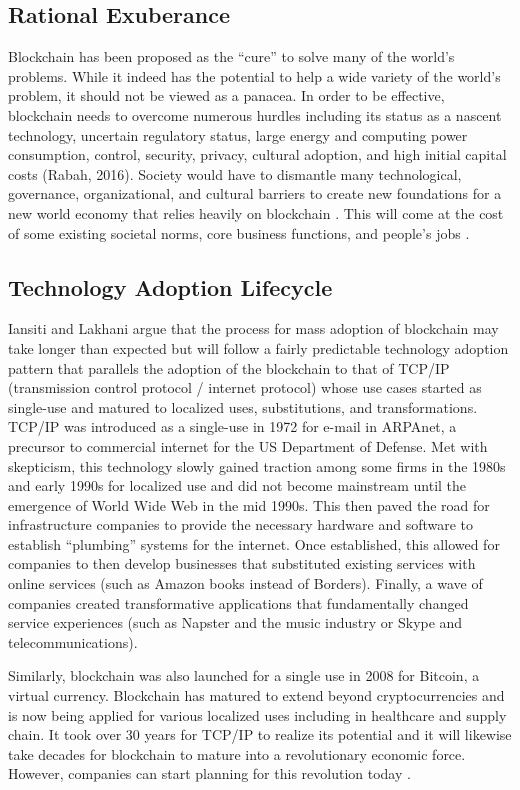 \documentclass[sigconf]{acmart}
\begin{document}
\subsection{Rational Exuberance}
Blockchain has been proposed as the ``cure'' to solve many of the world’s problems. While it indeed has the potential to help a wide variety of the world’s problem, it should not be viewed as a panacea. In order to be effective, blockchain needs to overcome numerous hurdles including its status as a nascent technology, uncertain regulatory status, large energy and computing power consumption, control, security, privacy, cultural adoption, and high initial capital costs (Rabah, 2016). Society would have to dismantle many technological, governance, organizational, and cultural barriers to create new foundations for a new world economy that relies heavily on blockchain \cite{hbr}. This will come at the cost of some existing societal norms, core business functions, and people’s jobs \cite{hbr} \cite{rabah2017overview}.

\subsection{Technology Adoption Lifecycle}
Iansiti and Lakhani \cite{hbr} argue that the process for mass adoption of blockchain may take longer than expected but will follow a fairly predictable technology adoption pattern that parallels the adoption of the blockchain to that of TCP/IP (transmission control protocol / internet protocol) whose use cases started as single-use and matured to localized uses, substitutions, and transformations. TCP/IP was introduced as a single-use in 1972 for e-mail in ARPAnet, a precursor to commercial internet for the US Department of Defense. Met with skepticism, this technology slowly gained traction among some firms in the 1980s and early 1990s for localized use and did not become mainstream until the emergence of World Wide Web in the mid 1990s. This then paved the road for infrastructure companies to provide the necessary hardware and software to establish ``plumbing'' systems for the internet. Once established, this allowed for companies to then develop businesses that substituted existing services with online services (such as Amazon books instead of Borders). Finally, a wave of companies created transformative applications that fundamentally changed service experiences (such as Napster and the music industry or Skype and telecommunications). 

Similarly, blockchain was also launched for a single use in 2008 for Bitcoin, a virtual currency. Blockchain has matured to extend beyond cryptocurrencies and is now being applied for various localized uses including in healthcare and supply chain. It took over 30 years for TCP/IP to realize its potential and it will likewise take decades for blockchain to mature into a revolutionary economic force. However, companies can start planning for this revolution today \cite{hbr}.
\end{document}
